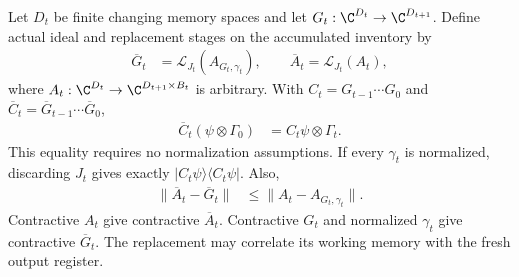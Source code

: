 \begin{theorem}
    \label{thm:construction_chronological_density}
    \leanok
    Let $D_t$ be finite changing memory spaces and let
    $G_t:\C^{D_t}\to\C^{D_{t+1}}$. Define actual ideal and replacement
    stages on the accumulated inventory by
    \begin{align}
        \overline G_t & =\mathcal L_{J_t}(A_{G_t,\gamma_t}),
        \qquad \overline A_t=\mathcal L_{J_t}(A_t),
        \label{eq:construction_chronological_gates}
    \end{align}
    where $A_t:\C^{D_t}\to\C^{D_{t+1}\times B_t}$ is arbitrary.
    With $C_t=G_{t-1}\cdots G_0$ and
    $\overline C_t=\overline G_{t-1}\cdots\overline G_0$,
    \begin{align}
        \overline C_t(\psi\otimes\Gamma_0)
         & =C_t\psi\otimes\Gamma_t.
        \label{eq:construction_chronological_prefix}
    \end{align}
    This equality requires no normalization assumptions.
    If every $\gamma_t$ is normalized, discarding $J_t$ gives exactly
    $|C_t\psi\rangle\langle C_t\psi|$. Also,
    \begin{align}
        \lVert\overline A_t-\overline G_t\rVert
         & \leq\lVert A_t-A_{G_t,\gamma_t}\rVert.
        \label{eq:construction_chronological_error}
    \end{align}
    Contractive $A_t$ give contractive $\overline A_t$.
    Contractive $G_t$ and normalized $\gamma_t$ give contractive
    $\overline G_t$. The replacement may correlate its working memory
    with the fresh output register.


\end{theorem}
